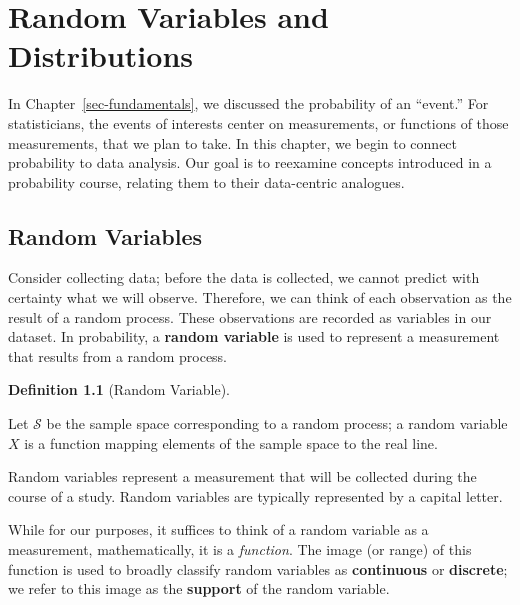 \documentclass[
  letterpaper,
  DIV=11,
  numbers=noendperiod]{scrreprt}
\theoremstyle{definition}
\newtheorem{definition}{Definition}[chapter]
\theoremstyle{plain}
\theoremstyle{definition}
\theoremstyle{remark}
\begin{document}

\chapter{Random Variables and Distributions}\label{sec-randomvariables}

\providecommand{\norm}[1]{\left\lVert#1\right\rVert}
\providecommand{\abs}[1]{\left\lvert#1\right\rvert}
\providecommand{\dist}[1]{\stackrel{\text{#1}}{\sim}}
\providecommand{\ind}[1]{\mathbb{I}\left(#1\right)}
\providecommand{\bm}[1]{\mathbf{#1}}
\providecommand{\bs}[1]{\boldsymbol{#1}}
\providecommand{\Ell}{\mathcal{L}}
\providecommand{\indep}{\perp\negthickspace\negmedspace\perp}

In Chapter~\ref{sec-fundamentals}, we discussed the probability of an
``event.'' For statisticians, the events of interests center on
measurements, or functions of those measurements, that we plan to take.
In this chapter, we begin to connect probability to data analysis. Our
goal is to reexamine concepts introduced in a probability course,
relating them to their data-centric analogues.

\section{Random Variables}\label{random-variables}

Consider collecting data; before the data is collected, we cannot
predict with certainty what we will observe. Therefore, we can think of
each observation as the result of a random process. These observations
are recorded as variables in our dataset. In probability, a
\textbf{random variable} is used to represent a measurement that results
from a random process.

\begin{definition}[Random
Variable]\protect\hypertarget{def-random-variable}{}\label{def-random-variable}

Let \(\mathcal{S}\) be the sample space corresponding to a random
process; a random variable \(X\) is a function mapping elements of the
sample space to the real line.

Random variables represent a measurement that will be collected during
the course of a study. Random variables are typically represented by a
capital letter.

\end{definition}

While for our purposes, it suffices to think of a random variable as a
measurement, mathematically, it is a \emph{function}. The image (or
range) of this function is used to broadly classify random variables as
\textbf{continuous} or \textbf{discrete}; we refer to this image as the
\textbf{support} of the random variable.
\end{document}
